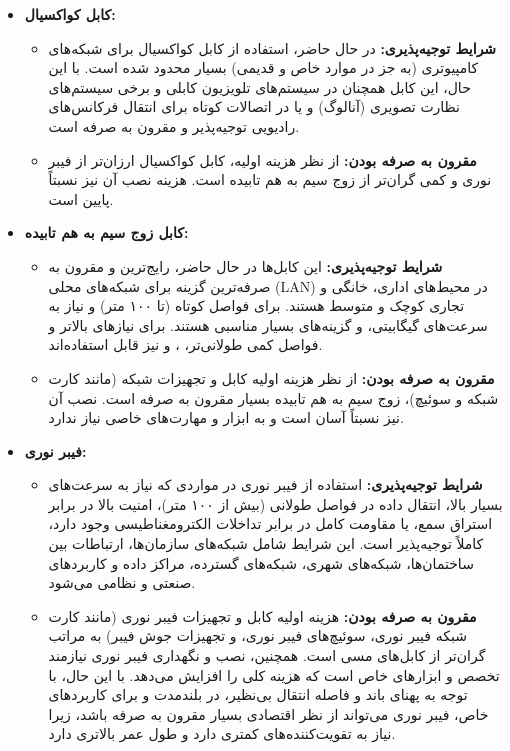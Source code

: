 \begin{itemize}
	\item \textbf{کابل کواکسیال:}
	\begin{itemize}
		\item \textbf{شرایط توجیه‌پذیری:} در حال حاضر، استفاده از کابل کواکسیال برای شبکه‌های کامپیوتری (به جز در موارد خاص و قدیمی) بسیار محدود شده است. با این حال، این کابل همچنان در سیستم‌های تلویزیون کابلی و برخی سیستم‌های نظارت تصویری (آنالوگ) و یا در اتصالات کوتاه برای انتقال فرکانس‌های رادیویی توجیه‌پذیر و مقرون به صرفه است.
		
		\item \textbf{مقرون به صرفه بودن:} از نظر هزینه اولیه، کابل کواکسیال ارزان‌تر از فیبر نوری و کمی گران‌تر از زوج سیم به هم تابیده است. هزینه نصب آن نیز نسبتاً پایین است.
	\end{itemize}
	
	\item \textbf{کابل زوج سیم به هم تابیده:}
	\begin{itemize}
		\item \textbf{شرایط توجیه‌پذیری:} این کابل‌ها در حال حاضر، رایج‌ترین و مقرون به صرفه‌ترین گزینه برای شبکه‌های محلی (LAN) در محیط‌های اداری، خانگی و تجاری کوچک و متوسط هستند. برای فواصل کوتاه (تا ۱۰۰ متر) و نیاز به سرعت‌های گیگابیتی،  و  گزینه‌های بسیار مناسبی هستند. برای نیازهای بالاتر و فواصل کمی طولانی‌تر، ،  و  نیز قابل استفاده‌اند.
		
		\item \textbf{مقرون به صرفه بودن:} از نظر هزینه اولیه کابل و تجهیزات شبکه (مانند کارت شبکه و سوئیچ)، زوج سیم به هم تابیده بسیار مقرون به صرفه است. نصب آن نیز نسبتاً آسان است و به ابزار و مهارت‌های خاصی نیاز ندارد.
	\end{itemize}
	
	\item \textbf{فیبر نوری:}
	\begin{itemize}
		\item \textbf{شرایط توجیه‌پذیری:} استفاده از فیبر نوری در مواردی که نیاز به سرعت‌های بسیار بالا، انتقال داده در فواصل طولانی (بیش از ۱۰۰ متر)، امنیت بالا در برابر استراق سمع، یا مقاومت کامل در برابر تداخلات الکترومغناطیسی وجود دارد، کاملاً توجیه‌پذیر است. این شرایط شامل شبکه‌های سازمان‌ها، ارتباطات بین ساختمان‌ها، شبکه‌های شهری، شبکه‌های گسترده، مراکز داده و کاربردهای صنعتی و نظامی می‌شود.
		
		\item \textbf{مقرون به صرفه بودن:} هزینه اولیه کابل و تجهیزات فیبر نوری (مانند کارت شبکه فیبر نوری، سوئیچ‌های فیبر نوری، و تجهیزات جوش فیبر) به مراتب گران‌تر از کابل‌های مسی است. همچنین، نصب و نگهداری فیبر نوری نیازمند تخصص و ابزارهای خاص است که هزینه کلی را افزایش می‌دهد. با این حال، با توجه به پهنای باند و فاصله انتقال بی‌نظیر، در بلندمدت و برای کاربردهای خاص، فیبر نوری می‌تواند از نظر اقتصادی بسیار مقرون به صرفه باشد، زیرا نیاز به تقویت‌کننده‌های کمتری دارد و طول عمر بالاتری دارد.
	\end{itemize}
\end{itemize}